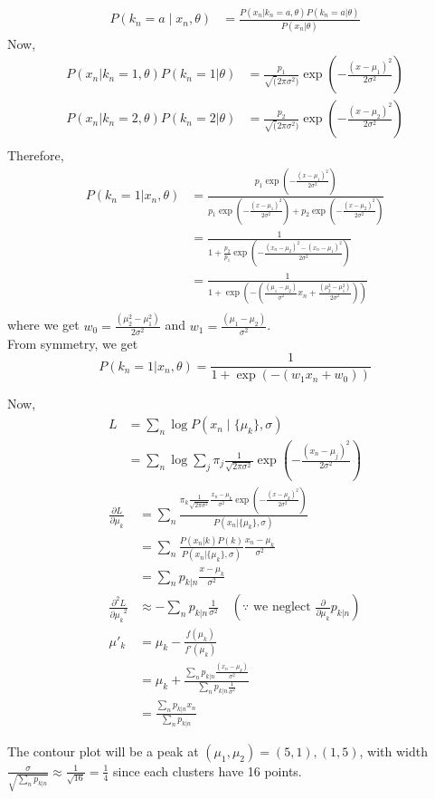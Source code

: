 \documentclass[12pt, a4paper]{article}
\begin{document}
\begin{sol}
\begin{align*}
P(k_n = a \mid x_n, \theta) &= \frac{P(x_n | k_n = a, \theta)P(k_n = a | \theta)}{P(x_n | \theta)}
\end{align*}
Now,
\begin{align*}
P(x_n | k_n = 1, \theta)P(k_n = 1 | \theta) &= \frac{p_1}{\sqrt(2\pi \sigma^2)} \exp(-\frac{(x-\mu_1)^2}{2\sigma^2}) \\
P(x_n | k_n = 2, \theta)P(k_n = 2 | \theta) &= \frac{p_2}{\sqrt(2\pi \sigma^2)} \exp(-\frac{(x-\mu_2)^2}{2\sigma^2}) \\
\end{align*}
Therefore,
\begin{align*}
P(k_n = 1 | x_n, \theta) &= \frac{p_1 \exp(-\frac{(x-\mu_1)^2}{2\sigma^2})}{p_1 \exp(-\frac{(x-\mu_1)^2}{2\sigma^2}) + p_2 \exp(-\frac{(x-\mu_2)^2}{2\sigma^2})} \\
&= \frac{1}{1 + \frac{p_2}{p_1}\exp(-\frac{(x_n - \mu_2)^2 - (x_n - \mu_1)^2}{2\sigma^2})} \\
&= \frac{1}{1 + \exp(-(\frac{(\mu_1 - \mu_2)}{\sigma^2}x_n + \frac{(\mu_2^2 - \mu_1^2)}{2\sigma^2}))} \\
\end{align*}
where we get $w_0 = \frac{(\mu_2^2 - \mu_1^2)}{2\sigma^2}$ and $w_1 = \frac{(\mu_1 - \mu_2)}{\sigma^2}$. \\
From symmetry, we get
$$P(k_n = 1 | x_n, \theta) = \frac{1}{1 + \exp(-(w_1x_n + w_0))}$$

Now, 
\begin{align*}
L &= \sum_n \log P(x_n \mid \{\mu_k\}, \sigma) \\
&= \sum_n \log \sum_j \pi_j \frac{1}{\sqrt{2\pi\sigma^2}}\exp(-\frac{(x_n - \mu_j)^2}{2\sigma^2})
\end{align*}
\begin{align*}
\frac{\partial L}{\partial \mu_k} &= \sum_n \frac{\pi_k \frac{1}{\sqrt{2\pi\sigma^2}} \frac{x_n-\mu_k}{\sigma^2}\exp(-\frac{(x - \mu_k)^2}{2\sigma^2})}{P(x_n | \{\mu_k\}, \sigma)} \\
&= \sum_n \frac{P(x_n | k)P(k)}{P(x_n | \{\mu_k\}, \sigma)} \frac{x_n-\mu_k}{\sigma^2} \\
&= \sum_n p_{k|n} \frac{x - \mu_k}{\sigma^2} \\
\frac{\partial^2 L}{{\partial \mu_k}^2} &\approx -\sum_n p_{k|n} \frac{1}{\sigma^2} \quad (\because \text{ we neglect } \frac{\partial}{\partial \mu_k} p_{k|n}) \\
\mu'_k &= \mu_k - \frac{f(\mu_k)}{f'(\mu_k)} \\
&= \mu_k + \frac{\sum_n p_{k|n} \frac{(x_n - \mu_k)}{\sigma^2}}{\sum_{n}p_{k|n}\frac{1}{\sigma^2}} \\
&= \frac{\sum_n p_{k|n} x_n}{\sum_n p_{k|n}}
\end{align*}

The contour plot will be a peak at $(\mu_1, \mu_2) = (5, 1), (1, 5)$, with width $\frac{\sigma}{\sqrt{\sum_n p_{k|n}}} \approx \frac{1}{\sqrt{16}} = \frac{1}{4}$ since each clusters have 16 points. 
\end{sol}
\bigskip
\end{document}
